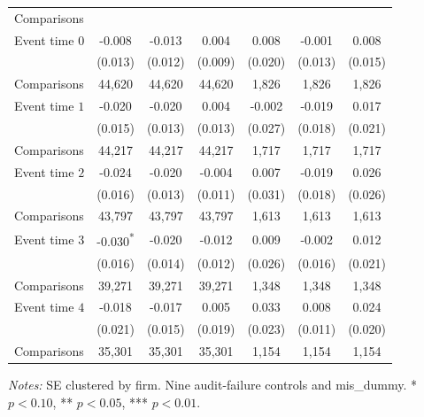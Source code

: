\documentclass[10pt]{article}
\newcommand{\sym}[1]{\textsuperscript{#1}}
\begin{document}
\begin{minipage}{19cm}
\begin{threeparttable}
\begin{tabular}{l c c c c c c }
Comparisons &  &  &  &  &  &  \\
Event time $0$ & -0.008 & -0.013 & 0.004 & 0.008 & -0.001 & 0.008 \\
 & (0.013) & (0.012) & (0.009) & (0.020) & (0.013) & (0.015) \\
Comparisons & 44,620 & 44,620 & 44,620 & 1,826 & 1,826 & 1,826 \\
Event time $1$ & -0.020 & -0.020 & 0.004 & -0.002 & -0.019 & 0.017 \\
 & (0.015) & (0.013) & (0.013) & (0.027) & (0.018) & (0.021) \\
Comparisons & 44,217 & 44,217 & 44,217 & 1,717 & 1,717 & 1,717 \\
Event time $2$ & -0.024 & -0.020 & -0.004 & 0.007 & -0.019 & 0.026 \\
 & (0.016) & (0.013) & (0.011) & (0.031) & (0.018) & (0.026) \\
Comparisons & 43,797 & 43,797 & 43,797 & 1,613 & 1,613 & 1,613 \\
Event time $3$ & -0.030\sym{*} & -0.020 & -0.012 & 0.009 & -0.002 & 0.012 \\
 & (0.016) & (0.014) & (0.012) & (0.026) & (0.016) & (0.021) \\
Comparisons & 39,271 & 39,271 & 39,271 & 1,348 & 1,348 & 1,348 \\
Event time $4$ & -0.018 & -0.017 & 0.005 & 0.033 & 0.008 & 0.024 \\
 & (0.021) & (0.015) & (0.019) & (0.023) & (0.011) & (0.020) \\
Comparisons & 35,301 & 35,301 & 35,301 & 1,154 & 1,154 & 1,154 \\
\bottomrule
\end{tabular}
\begin{tablenotes}\fontsize{9}{11}\selectfont
\item \raggedright \fontsize{9}{11}\selectfont \textit{Notes:} SE clustered by firm. Nine audit-failure controls and mis\_dummy. * $p<0.10$, ** $p<0.05$, *** $p<0.01$.
\end{tablenotes}
\end{threeparttable}

\end{minipage}
\end{document}
